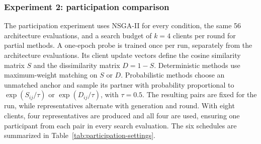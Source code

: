 \documentclass[11pt]{article}
\begin{document}
\subsubsection{Experiment 2: participation comparison}

The participation experiment uses NSGA-II for every condition, the same 56 architecture evaluations, and a search budget of $k=4$ clients per round for partial methods. A one-epoch probe is trained once per run, separately from the architecture evaluations. Its client update vectors define the cosine similarity matrix $S$ and the dissimilarity matrix $D=1-S$. Deterministic methods use maximum-weight matching on $S$ or $D$. Probabilistic methods choose an unmatched anchor and sample its partner with probability proportional to $\exp(S_{ij}/\tau)$ or $\exp(D_{ij}/\tau)$, with $\tau=0.5$. The resulting pairs are fixed for the run, while representatives alternate with generation and round. With eight clients, four representatives are produced and all four are used, ensuring one participant from each pair in every search evaluation. The six schedules are summarized in Table~\ref{tab:participation-settings}.

\begin{table}[t]
\centering
\caption{Participant schedules in the NSGA-II participation experiment. The probe is common to all conditions in a run and is not used as the candidate fitness model.}
\label{tab:participation-settings}
\scriptsize
{}
\end{table}
\end{document}
